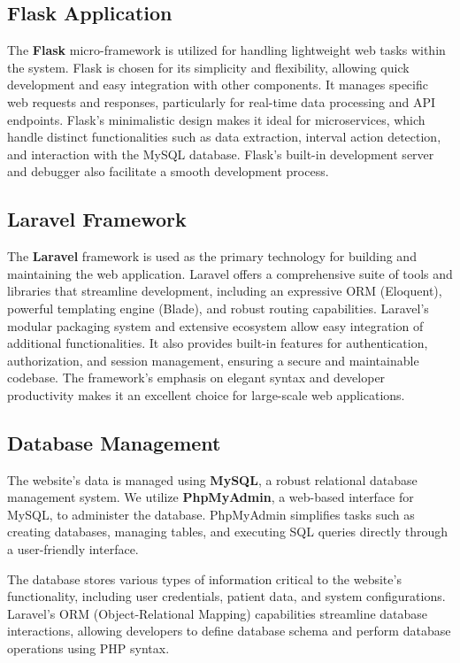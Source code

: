 \documentclass{article}
\begin{document}
\subsection{Flask Application}

The \textbf{Flask} micro-framework is utilized for handling lightweight web tasks within the system. Flask is chosen for its simplicity and flexibility, allowing quick development and easy integration with other components. It manages specific web requests and responses, particularly for real-time data processing and API endpoints. Flask's minimalistic design makes it ideal for microservices, which handle distinct functionalities such as data extraction, interval action detection, and interaction with the MySQL database. Flask's built-in development server and debugger also facilitate a smooth development process.

\subsection{Laravel Framework}

The \textbf{Laravel} framework is used as the primary technology for building and maintaining the web application. Laravel offers a comprehensive suite of tools and libraries that streamline development, including an expressive ORM (Eloquent), powerful templating engine (Blade), and robust routing capabilities. Laravel's modular packaging system and extensive ecosystem allow easy integration of additional functionalities. It also provides built-in features for authentication, authorization, and session management, ensuring a secure and maintainable codebase. The framework's emphasis on elegant syntax and developer productivity makes it an excellent choice for large-scale web applications.

\subsection{Database Management}

The website's data is managed using \textbf{MySQL}, a robust relational database management system. We utilize \textbf{PhpMyAdmin}, a web-based interface for MySQL, to administer the database. PhpMyAdmin simplifies tasks such as creating databases, managing tables, and executing SQL queries directly through a user-friendly interface.

The database stores various types of information critical to the website's functionality, including user credentials, patient data, and system configurations. Laravel's ORM (Object-Relational Mapping) capabilities streamline database interactions, allowing developers to define database schema and perform database operations using PHP syntax.
\end{document}
